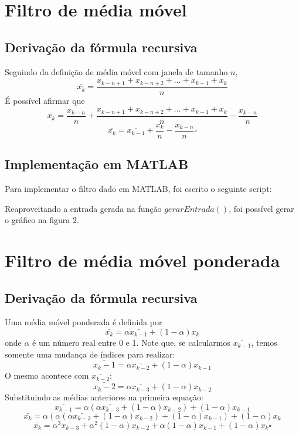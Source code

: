 \documentclass[12pt, a4paper, twoside]{article}
\begin{document}
\section{Filtro de média móvel}

\subsection{Derivação da fórmula recursiva}

Seguindo da definição de média móvel com janela de tamanho $n$,
$$\bar{x_k}=\frac{x_{k-n+1}+x_{k-n+2}+\ldots+x_{k-1}+x_{k}}{n}$$
É possível afirmar que
$$\bar{x_k}=\frac{x_{k-n}}{n} + \frac{x_{k-n+1}+x_{k-n+2}+\ldots+x_{k-1}+x_{k}}{n} -\frac{x_{k-n}}{n}$$
$$\bar{x_k}=\bar{x_{k-1}} + \frac{x_k}{n} - \frac{x_{k-n}}{n}\square$$


\subsection{Implementação em MATLAB}

Para implementar o filtro dado em MATLAB, foi escrito o seguinte script:



Reaproveitando a entrada gerada na função $gerarEntrada()$, foi possível gerar o gráfico na figura 2.

\section{Filtro de média móvel ponderada}

\subsection{Derivação da fórmula recursiva}

Uma média móvel ponderada é definida por
$$\bar{x_k}=\alpha\bar{x_{k-1}}+(1-\alpha)x_k$$
onde $\alpha$ é um número real entre 0 e 1. Note que, se calcularmos $\bar{x_{k-1}}$, temos somente uma mudança de índices para realizar:
$$\bar{x_k-1}=\alpha\bar{x_{k-2}}+(1-\alpha)x_{k-1}$$
O mesmo acontece com $\bar{x_{k-2}}$:
$$\bar{x_k-2}=\alpha\bar{x_{k-3}}+(1-\alpha)x_{k-2}$$
Substituindo as médias anteriores na primeira equação:
$$\bar{x_{k-1}}=\alpha(\alpha\bar{x_{k-3}}+(1-\alpha)x_{k-2})+(1-\alpha)x_{k-1}$$
$$\bar{x_{k}}=\alpha(\alpha(\alpha\bar{x_{k-3}}+(1-\alpha)x_{k-2})+(1-\alpha)x_{k-1})+(1-\alpha)x_k$$
$$\bar{x_k}=\alpha^3\bar{x_{k-3}}+\alpha^2(1-\alpha)x_{k-2}+\alpha(1-\alpha)x_{k-1}+(1-\alpha)x_k\square$$
\end{document}
